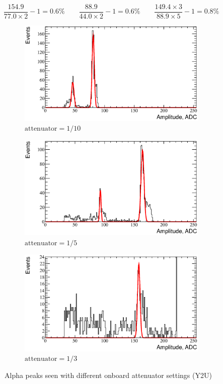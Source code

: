 \documentclass[a4paper,12pt]{article}
\begin{document}
\begin{equation}
\frac{154.9}{77.0 \times 2} - 1 = 0.6\%
\qquad
\frac{88.9}{44.0 \times 2} - 1 = 0.6\%
\qquad
\frac{149.4 \times 3}{88.9 \times 5} - 1 = 0.8\%
\end{equation}


\begin{figure}[p]
\begin{subfigure}[b]{0.3\textwidth}
\includegraphics[width=\textwidth]{gfx/atten_1_over_10_ch06.eps}
\caption{$\text{attenuator}=1/10$}
\end{subfigure}
\begin{subfigure}[b]{0.3\textwidth}
\includegraphics[width=\textwidth]{gfx/atten_1_over_5_ch06.eps}
\caption{$\text{attenuator}=1/5$}
\end{subfigure}
\begin{subfigure}[b]{0.3\textwidth}
\includegraphics[width=\textwidth]{gfx/atten_1_over_3_ch06.eps}
\caption{$\text{attenuator}=1/3$}
\end{subfigure}
\caption{Alpha peaks seen with different onboard attenuator settings (Y2U)}
\label{fig:atten_distrib}
\end{figure}
\end{document}
